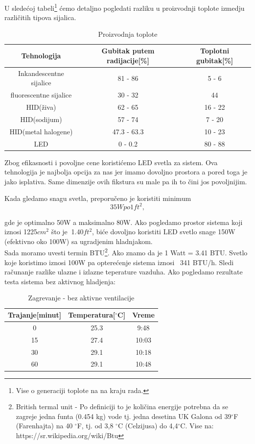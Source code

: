 \documentclass[a4paper,11pt]{book}
\begin{document}
U sledećoj tabeli\footnote{Vise o generaciji toplote na na kraju rada.} ćemo detaljno pogledati razliku u proizvodnji toplote izmedju različitih tipova sijalica.


\begin{table}[ht]
  \caption{Proizvodnja toplote}
  \centering
  \begin{tabular}{|c|c|c|}
  \hline
    Tehnologija & Gubitak putem radijacije[\%] & Toplotni gubitak[\%] \\ \hline
  Inkandescentne sijalice & 81 - 86 & 5 - 6 \\ \hline
  fluorescentne sijalice & 30 - 32 & 44 \\ \hline
  HID(živa) & 62 - 65 & 16 - 22 \\ \hline
  HID(sodijum) & 57 - 74 & 7 - 20 \\ \hline
  HID(metal halogene) & 47.3 - 63.3 & 10 - 23 \\ \hline
  LED & 0 - 0.2 & 80 - 88 \\ \hline
  \end{tabular}
\end{table}

Zbog efikasnosti i povoljne cene koristićemo LED svetla za sistem. Ova tehnologija je najbolja opcija za nas jer imamo dovoljno prostora a pored toga je jako isplativa. Same dimenzije ovih fikstura su male pa ih to čini jos povoljnijim.


Kada gledamo snagu svetla, preporučeno je koristiti minimum 
\[35W po 1ft^2,\]

gde je optimalno 50W a maksimalno 80W. Ako pogledamo prostor sistema koji iznosi 1225$cm^2$ što je $~$1.40$ft^2$, biće dovoljno koristiti LED svetlo snage 150W (efektivno oko 100W) sa ugradjenim hladnjakom.\\

Sada moramo uvesti termin BTU\footnote{British termal unit - Po definiciji to je količina energije potrebna da se zagreje jedna funta (0.454 kg) vode tj. jedna desetina UK Galona od 39$^\circ$F (Farenhajta) na 40 $^\circ$F, tj. od 3,8 $^\circ$C (Celzijusa) do 4,4$^\circ$C. Vise na: https://sr.wikipedia.org/wiki/Btu}. Ako znamo da je 1 Watt = 3.41 BTU. Svetlo koje koristimo iznosi 100W pa opterećenje sistema iznosi ~341 BTU/h. Sledi računanje razlike ulazne i izlazne teperature vazduha. Ako pogledamo rezultate testa sistema bez aktivnog hladjenja:

\begin{table}[ht]
  \caption{Zagrevanje - bez aktivne ventilacije}
  \centering
  \begin{tabular}{|c|c|c|}
  \hline
    Trajanje[minut] & Temperatura[$^\circ$C] & Vreme\\ \hline
  0 & 25.3 & 9:48 \\ \hline
  15 & 27.4 & 10:03 \\ \hline
  30 & 29.1 & 10:18 \\ \hline
  60 & 29.1 & 10:48 \\ \hline
  \end{tabular}
\end{table}
\end{document}
